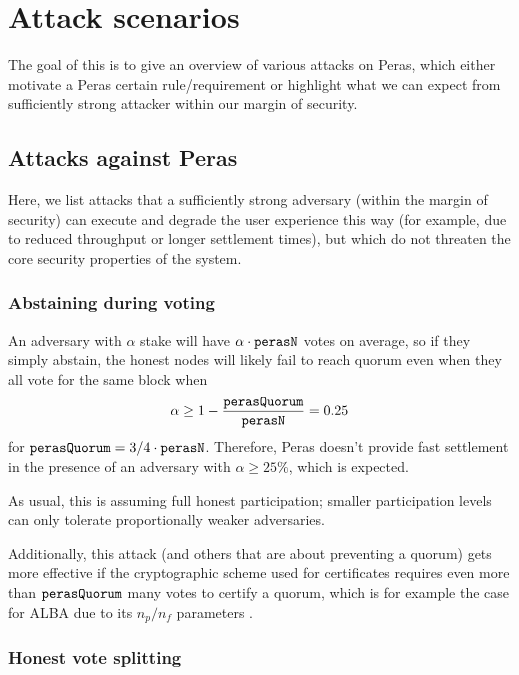 \chapter{Attack scenarios}\label{chap:attack scenarios}

The goal of this  is to give an overview of various attacks on Peras, which either motivate a Peras certain rule/requirement or highlight what we can expect from sufficiently strong attacker within our margin of security.

\section{Attacks against Peras}

Here, we list attacks that a sufficiently strong adversary (within the margin of security) can execute and degrade the user experience this way (for example, due to reduced throughput or longer settlement times), but which do not threaten the core security properties of the system.

\subsection{Abstaining during voting}\label{sec:abstaining during voting}

An adversary with $\alpha$ stake will have $\alpha\cdot\mathtt{perasN}$ votes on average, so if they simply abstain, the honest nodes will likely fail to reach quorum even when they all vote for the same block when \[ \alpha \ge 1-\frac{\mathtt{perasQuorum}}{\mathtt{perasN}} = 0.25 \]
for $\mathtt{perasQuorum} = 3/4 \cdot \mathtt{perasN}$. Therefore, Peras doesn't provide fast settlement in the presence of an adversary with $\alpha\ge 25\%$, which is expected.

As usual, this is assuming full honest participation; smaller participation levels can only tolerate proportionally weaker adversaries.

Additionally, this attack (and others that are about preventing a quorum) gets more effective if the cryptographic scheme used for certificates requires even more than $\mathtt{perasQuorum}$ many votes to certify a quorum, which is for example the case for ALBA due to its $n_p/n_f$ parameters \parencite{chaidos2024approximate}.

\subsection{Honest vote splitting}\label{sec:honest vote splitting}

